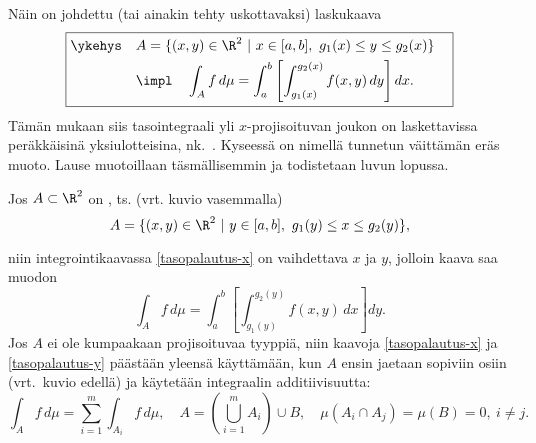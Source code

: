 Näin on johdettu (tai ainakin tehty uskottavaksi) laskukaava
\begin{equation} \label{tasopalautus-x}
\boxed{ \begin{aligned}
\ykehys\quad&A=\{(x,y)\in\R^2 \ | \ x\in [a,b], \ g_1(x)\leq y\leq g_2(x)\} \quad\\
            &\impl \quad \int_A f\,d\mu 
                         = \int_a^b\left[\int_{g_1(x)}^{g_2(x)} f(x,y)\,dy\right]dx. \quad
           \end{aligned} } 
\end{equation}
Tämän mukaan siis tasointegraali yli $x$-projisoituvan joukon on laskettavissa peräkkäisinä
%
yksiulotteisina, nk.\ . Kyseessä on  
nimellä tunnetun väittämän eräs muoto. Lause muotoillaan täsmällisemmin ja todistetaan luvun 
lopussa.

%
Jos $A\subset\R^2$ on , ts. (vrt. kuvio vasemmalla)
\[
A=\{(x,y)\in\R^2 \ | \ y\in [a,b], \ g_1(y)\leq x \leq g_2(y)\}, \\[3mm]
\]
\begin{multicols}{2} \raggedcolumns
\begin{figure}[H]
\begin{center}

\end{center}
\end{figure}
\begin{figure}[H]
\begin{center}

\end{center}
\end{figure}
\end{multicols}
niin integrointikaavassa \eqref{tasopalautus-x} on vaihdettava $x$ ja $y$, jolloin kaava saa
muodon
\begin{equation} \label{tasopalautus-y}
\int_A f\,d\mu=\int_a^b\left[\int_{g_1(y)}^{g_2(y)} f(x,y)\,dx\right]dy.
\end{equation}
Jos $A$ ei ole kumpaakaan projisoituvaa tyyppiä, niin kaavoja \eqref{tasopalautus-x} ja 
\eqref{tasopalautus-y} päästään yleensä käyttämään, kun $A$ ensin jaetaan sopiviin osiin 
(vrt.\ kuvio edellä) ja käytetään integraalin additiivisuutta:
\[
\int_A f\,d\mu=\sum_{i=1}^m \int_{A_i} f\,d\mu,\quad A
              =\left(\bigcup_{i=1}^m A_i\right)\cup B, \quad \mu(A_i\cap A_j)
              =\mu(B)=0,\ i\neq j.
\]

